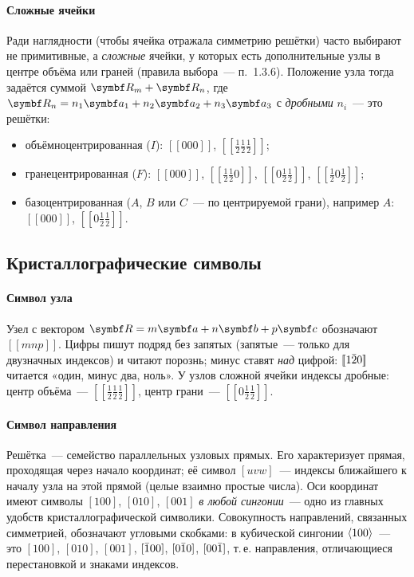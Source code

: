 \paragraph{Сложные ячейки}
Ради наглядности (чтобы ячейка отражала симметрию решётки) часто
выбирают не примитивные, а \emph{сложные} ячейки, у которых есть
дополнительные узлы в центре объёма или граней (правила выбора~—
п.~1.3.6). Положение узла тогда задаётся суммой $\vb R_m+\vb R_n$, где
$\vb R_n=n_1\vb a_1+n_2\vb a_2+n_3\vb a_3$ с \emph{дробными} $n_i$~— это
 решётки:
\begin{itemize}
\item объёмноцентрированная ($I$): $[\![000]\!]$, $[\![\tfrac12\tfrac12\tfrac12]\!]$;
\item гранецентрированная ($F$): $[\![000]\!]$, $[\![\tfrac12\tfrac120]\!]$,
$[\![0\tfrac12\tfrac12]\!]$, $[\![\tfrac120\tfrac12]\!]$;
\item базоцентрированная ($A$, $B$ или $C$~— по центрируемой грани), например
$A$: $[\![000]\!]$, $[\![0\tfrac12\tfrac12]\!]$.
\end{itemize}

\subsection{Кристаллографические символы}\label{ssec:symbols}

\paragraph{Символ узла}
Узел с вектором $\vb R=m\vb a+n\vb b+p\vb c$ обозначают $[\![mnp]\!]$. Цифры
пишут подряд без запятых (запятые~— только для двузначных индексов) и
читают порознь; минус ставят \emph{над} цифрой: $[\![1\bar{2}0]\!]$ читается
«один, минус два, ноль». У узлов сложной ячейки индексы дробные: центр
объёма~— $[\![\tfrac12\tfrac12\tfrac12]\!]$, центр грани~—
$[\![0\tfrac12\tfrac12]\!]$.

\paragraph{Символ направления}
Решётка~— семейство параллельных узловых прямых. Его характеризует
прямая, проходящая через начало координат; её символ $[uvw]$~— индексы
ближайшего к началу узла на этой прямой (целые взаимно простые числа).
Оси координат имеют символы $[100]$, $[010]$, $[001]$ \emph{в любой
сингонии}~— одно из главных удобств кристаллографической символики.
Совокупность направлений, связанных симметрией, обозначают угловыми
скобками: в кубической сингонии $\langle 100\rangle$~— это $[100]$, $[010]$,
$[001]$, $[\bar{1}00]$, $[0\bar{1}0]$, $[00\bar{1}]$, т.\,е. направления,
отличающиеся перестановкой и знаками индексов.

